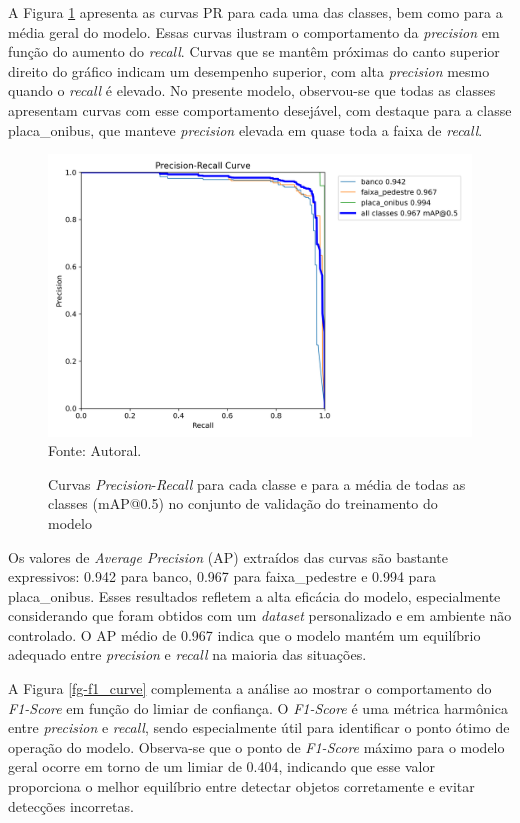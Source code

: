 A Figura \ref{fg-pr_curve} apresenta as curvas PR para cada uma das classes, bem como para a média geral do modelo. Essas curvas ilustram o comportamento da \textit{precision} em função do aumento do \textit{recall}. Curvas que se mantêm próximas do canto superior direito do gráfico indicam um desempenho superior, com alta \textit{precision} mesmo quando o \textit{recall} é elevado. No presente modelo, observou-se que todas as classes apresentam curvas com esse comportamento desejável, com destaque para a classe placa\_onibus, que manteve \textit{precision} elevada em quase toda a faixa de \textit{recall}.

\begin{figure}[htbp]
  \centering
  \caption{Curvas \textit{Precision}-\textit{Recall} para cada classe e para a média de todas as classes (mAP@0.5) no conjunto de validação do treinamento do modelo}
  \includegraphics[width=1\textwidth]{Figuras/PR_curve.png}
  \\
  Fonte: Autoral.
  \label{fg-pr_curve}
\end{figure}

Os valores de \textit{Average Precision} (AP) extraídos das curvas são bastante expressivos: 0.942 para banco, 0.967 para faixa\_pedestre e 0.994 para placa\_onibus. Esses resultados refletem a alta eficácia do modelo, especialmente considerando que foram obtidos com um \textit{dataset} personalizado e em ambiente não controlado. O AP médio de 0.967 indica que o modelo mantém um equilíbrio adequado entre \textit{precision} e \textit{recall} na maioria das situações.

A Figura \ref{fg-f1_curve} complementa a análise ao mostrar o comportamento do \textit{F1-Score} em função do limiar de confiança. O \textit{F1-Score} é uma métrica harmônica entre \textit{precision} e \textit{recall}, sendo especialmente útil para identificar o ponto ótimo de operação do modelo. Observa-se que o ponto de \textit{F1-Score} máximo para o modelo geral ocorre em torno de um limiar de 0.404, indicando que esse valor proporciona o melhor equilíbrio entre detectar objetos corretamente e evitar detecções incorretas.

